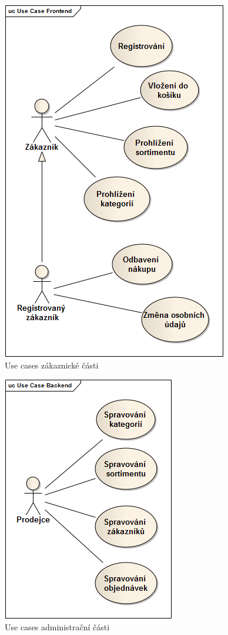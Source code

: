 \documentclass[11pt,twoside,a4paper]{book}
\begin{document}
\begin{figure}[h!]
\begin{center}
\includegraphics[scale=0.75]{figures/usecasefront}
\caption{Use cases zákaznické části}
\label{fig:usecasefront}
\end{center}
\end{figure}

\begin{figure}[h!]
\begin{center}
\includegraphics[scale=0.75]{figures/usecaseback}
\caption{Use cases administrační části}
\label{fig:usecaseback}
\end{center}
\end{figure}
\end{document}
